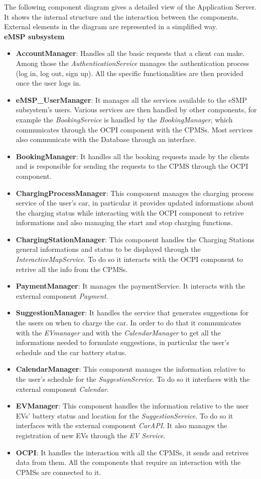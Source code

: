 \documentclass[table, 12pt]{article}
\begin{document}
The following component diagram gives a detailed view of the Application Server. It shows the internal structure and the interaction between the components.
External elements in the diagram are represented in a simplified way.
\\
\textbf{eMSP subsystem}
\begin{itemize}
    \item \textbf{AccountManager}: Handles all the basic requests that a client can make. Among those the \textit{AuthenticationService} manages the authentication process (log in, log out, sign up). All the specific functionalities are then provided once the user logs in.
    \item \textbf{eMSP\_UserManager}: It manages all the services available to the eSMP subsystem's users. Various services are then handled by other components, for example the \textit{BookingService} is handled by the \textit{BookingManager}, which communicates through the OCPI component with the CPMSs. Most services also communicate with the Database through an interface.
    \item \textbf{BookingManager}: It handles all the booking requests made by the clients and is responsible for sending the requests to the CPMS through the OCPI component.
    \item \textbf{ChargingProcessManager}: This component manages the charging process service of the user's car, in particular it provides updated informations about the charging status while interacting with the OCPI component to retrive informations and also managing the start and stop charging functions.
    \item \textbf{ChargingStationManager}: This component  handles the Charging Stations general informations and status to be displayed through the \textit{InteractiveMapService}. To do so it interacts with the OCPI component to retrive all the info from the CPMSs.
    \item \textbf{PaymentManager}: It manages the paymentService. It interacts with the external component \textit{Payment}.
    \item \textbf{SuggestionManager}: It handles the service that generates suggestions for the users on when to charge the car. In order to do that it communicates with the \textit{EVmanager} and with the \textit{CalendarManager} to get all the informations needed to formulate suggestions, in particular the user's schedule and the car battery status.
    \item \textbf{CalendarManager}: This component manages the information relative to the user's schedule for the \textit{SuggestionService}. To do so it interfaces with the external component \textit{Calendar}.
    \item \textbf{EVManager}: This component handles the information relative to the user EVs' battery status and location for the \textit{SuggestionService}. To do so it interfaces with the external component \textit{CarAPI}. It also manages the registration of new EVs through the \textit{EV Service}.
    \item \textbf{OCPI}: It handles the interaction with all the CPMSs, it sends and retrives data from them. All the components that require an interaction with the CPMSs are connected to it.
\end{itemize}
\end{document}
